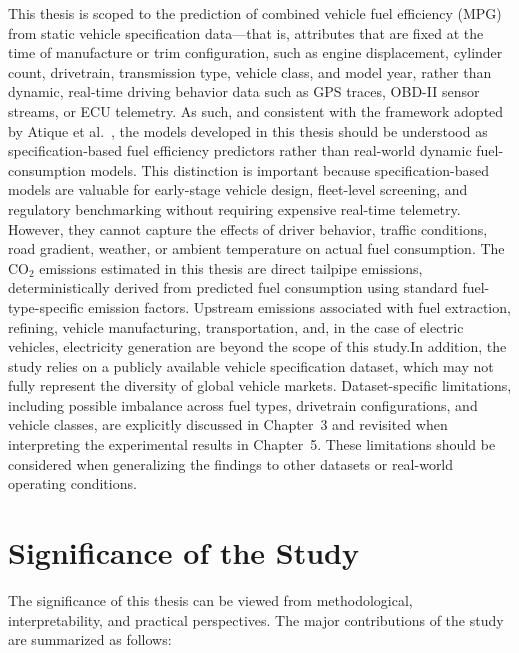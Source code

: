 This thesis is scoped to the prediction of combined vehicle fuel efficiency (MPG) from static vehicle specification data---that is, attributes that are fixed at the time of manufacture or trim configuration, such as engine displacement, cylinder count, drivetrain, transmission type, vehicle class, and model year, rather than dynamic, real-time driving behavior data such as GPS traces, OBD-II sensor streams, or ECU telemetry. As such, and consistent with the framework adopted by Atique et al.~\cite{atique2026explainable}, the models developed in this thesis should be understood as specification-based fuel efficiency predictors rather than real-world dynamic fuel-consumption models. This distinction is important because specification-based models are valuable for early-stage vehicle design, fleet-level screening, and regulatory benchmarking without requiring expensive real-time telemetry. However, they cannot capture the effects of driver behavior, traffic conditions, road gradient, weather, or ambient temperature on actual fuel consumption.
The CO$_2$ emissions estimated in this thesis are direct tailpipe emissions, deterministically derived from predicted fuel consumption using standard fuel-type-specific emission factors. Upstream emissions associated with fuel extraction, refining, vehicle manufacturing, transportation, and, in the case of electric vehicles, electricity generation are beyond the scope of this study.In addition, the study relies on a publicly available vehicle specification dataset, which may not fully represent the diversity of global vehicle markets. Dataset-specific limitations, including possible imbalance across fuel types, drivetrain configurations, and vehicle classes, are explicitly discussed in Chapter~3 and revisited when interpreting the experimental results in Chapter~5. These limitations should be considered when generalizing the findings to other datasets or real-world operating conditions.


\section{Significance of the Study}

The significance of this thesis can be viewed from methodological, interpretability, and practical perspectives. The major contributions of the study are summarized as follows:

